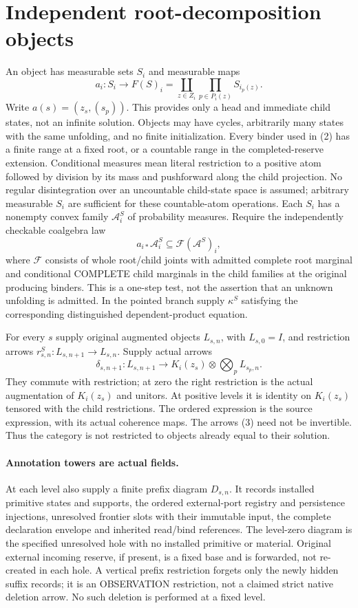 \documentclass[11pt]{article}
\begin{document}
\section{Independent root-decomposition objects}
An object has measurable sets $S_i$ and measurable maps
\[
 a_i:S_i\longrightarrow F(S)_i
 =\coprod_{z\in Z_i}\prod_{p\in P_i(z)}S_{i_p(z)}.
 \tag{1}
\]
Write $a(s)=(z_s,(s_p))$. This provides only a head and immediate child states, not an infinite solution. Objects may have cycles, arbitrarily many states with the same unfolding, and no finite initialization. Every binder used in (2) has a finite range at a fixed root, or a countable range in the completed-reserve extension. Conditional measures mean literal restriction to a positive atom followed by division by its mass and pushforward along the child projection. No regular disintegration over an uncountable child-state space is assumed; arbitrary measurable $S_i$ are sufficient for these countable-atom operations. Each $S_i$ has a nonempty convex family $\mathcal A^S_i$ of probability measures. Require the independently checkable coalgebra law
\[
 a_{i*}\mathcal A^S_i\subseteq\mathcal F(\mathcal A^S)_i, \tag{2}
\]
where $\mathcal F$ consists of whole root/child joints with admitted complete root marginal and conditional COMPLETE child marginals in the child families at the original producing binders. This is a one-step test, not the assertion that an unknown unfolding is admitted. In the pointed branch supply $\kappa^S$ satisfying the corresponding distinguished dependent-product equation.

For every $s$ supply original augmented objects $L_{s,n}$, with $L_{s,0}=I$, and restriction arrows $r^S_{s,n}:L_{s,n+1}\to L_{s,n}$. Supply actual arrows
\[
 \delta_{s,n+1}:L_{s,n+1}\longrightarrow
 K_i(z_s)\otimes\bigotimes_p L_{s_p,n}. \tag{3}
\]
They commute with restriction; at zero the right restriction is the actual augmentation of $K_i(z_s)$ and unitors. At positive levels it is identity on $K_i(z_s)$ tensored with the child restrictions. The ordered expression is the source expression, with its actual coherence maps. The arrows (3) need not be invertible. Thus the category is not restricted to objects already equal to their solution.

\paragraph{Annotation towers are actual fields.}
At each level also supply a finite prefix diagram $D_{s,n}$. It records installed primitive states and supports, the ordered external-port registry and persistence injections, unresolved frontier slots with their immutable input, the complete declaration envelope and inherited read/bind references. The level-zero diagram is the specified unresolved hole with no installed primitive or material. Original external incoming reserve, if present, is a fixed base and is forwarded, not re-created in each hole. A vertical prefix restriction forgets only the newly hidden suffix records; it is an OBSERVATION restriction, not a claimed strict native deletion arrow. No such deletion is performed at a fixed level.
\end{document}
